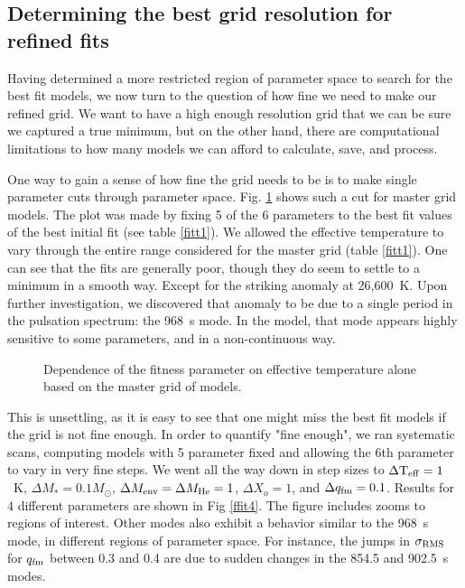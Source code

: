 \documentclass[12pt,preprint]{aastex}
\begin{document}
\subsection{Determining the best grid resolution for refined fits}
\label{refinedfits}


Having determined a more restricted region of parameter space to search for 
the best fit models, we now turn to the question of how fine we need to 
make our refined grid. We want to have a high enough resolution grid that 
we can be sure we captured a true minimum, but on the other hand, there are 
computational limitations to how many models we can afford to calculate, 
save, and process.

One way to gain a sense of how fine the grid needs to be is to make single 
parameter cuts through parameter space. Fig.  \ref{ffit3} shows such a cut 
for master grid models. The plot was made by fixing 5 of the 6 parameters 
to the best fit values of the best initial fit (see table \ref{fitt1}).
We allowed the effective temperature to vary through the entire range 
considered for the master grid (table \ref{fitt1}). One can see that the 
fits are generally poor, though they do seem to settle to a minimum in a 
smooth way. Except for the striking anomaly at 26,600~K. Upon further 
investigation, we discovered that anomaly to be due to a single period in 
the pulsation spectrum: the 968~s mode. In the model, that mode appears 
highly sensitive to some parameters, and in a non-continuous way.

\begin{figure}
\caption{
Dependence of the fitness parameter on effective temperature alone based on 
the master grid of models. \label{ffit3}
}
\end{figure}

This is unsettling, as it is easy to see that one might miss the best fit 
models if the grid is not fine enough. In order to quantify "fine enough", 
we ran systematic scans, computing models with 5 parameter fixed and allowing 
the 6th parameter to vary in very fine steps. We went all the way down in 
step sizes to $\Delta {\rm T_{eff}}=1$~K, $\Delta M_*=0.1 M_\odot$, 
$\Delta M_{\rm env}= \Delta M_{\rm He}=1$, $\Delta X_o=1$, and $\Delta q_{\rm fm}=0.1$. 
Results for 4 different parameters are shown in Fig \ref{ffit4}. The figure 
includes zooms to regions of interest. Other modes also exhibit a behavior 
similar to the 968~s mode, in different regions of parameter space. For instance, 
the jumps in $\sigma_{\rm RMS}$ for $q_{\rm fm}$ between 0.3 and 0.4 are due 
to sudden changes in the 854.5 and 902.5~s modes.
\end{document}
